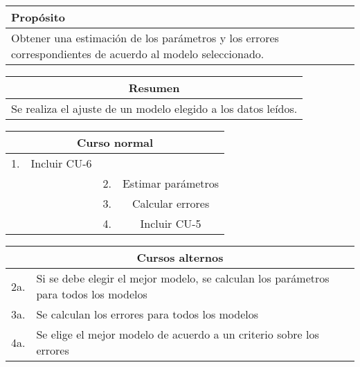 \begin{table}[!h]
\begin{tabularx}{\textwidth}{|X|}
\hline
\cellcolor{cyan} \textbf{Propósito} \\
\hline
Obtener una estimación de los parámetros y los errores correspondientes de acuerdo al modelo seleccionado. \\
\hline
\end{tabularx}
\end{table}

\begin{table}[!h]
\begin{tabular}{|c|}
\hline
\cellcolor{cyan} \textbf{Resumen}  \\
\hline
Se realiza el ajuste de un modelo elegido a los datos leídos. \\
\hline
\end{tabular}
\end{table}

\begin{table}[!h]
\begin{tabular}{|c|c|c|c|}
\hline
\multicolumn{4}{|c|}{\cellcolor{cyan} \textbf{Curso normal}} \\
\hline
     1.         &     Incluir CU-6           &              &              \\
\hline
              &               &    2.          &     Estimar parámetros         \\
\hline
              &               &    3.          &     Calcular errores         \\
\hline
              &               &    4.          &     Incluir CU-5            \\
\hline
\end{tabular}
\end{table}

\begin{table}[!h]
\begin{tabularx}{\textwidth}{|c|X|}
\hline
\multicolumn{2}{|c|}{\cellcolor{cyan} \textbf{Cursos alternos}} \\
\hline
     2a.         &    Si se debe elegir el mejor modelo, se calculan los parámetros para todos los modelos          \\
\hline
     3a.         &    Se calculan los errores para todos los modelos          \\
\hline
     4a.         &    Se elige el mejor modelo de acuerdo a un criterio sobre los errores          \\
\hline
\end{tabularx}
\end{table}

